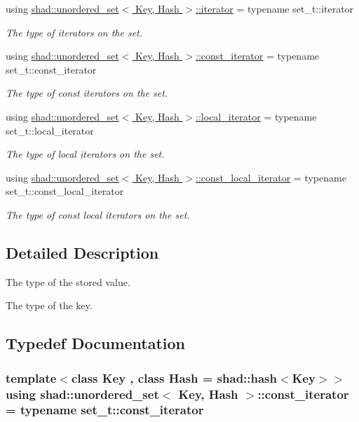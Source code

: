 \begin{DoxyCompactItemize}
using \hyperlink{group__Types_gadbad50ac069a38bd820c0a9f532f903e}{shad\-::unordered\-\_\-set$<$ Key, Hash $>$\-::iterator} = typename set\-\_\-t\-::iterator
\begin{DoxyCompactList}\small\item\em The type of iterators on the set. \end{DoxyCompactList}\item 
using \hyperlink{group__Types_ga074f67d0516c3a68d8c79976aef62fb1}{shad\-::unordered\-\_\-set$<$ Key, Hash $>$\-::const\-\_\-iterator} = typename set\-\_\-t\-::const\-\_\-iterator
\begin{DoxyCompactList}\small\item\em The type of const iterators on the set. \end{DoxyCompactList}\item 
using \hyperlink{group__Types_gae1ee2e5ce1b39afa3cb1ce248747324d}{shad\-::unordered\-\_\-set$<$ Key, Hash $>$\-::local\-\_\-iterator} = typename set\-\_\-t\-::local\-\_\-iterator
\begin{DoxyCompactList}\small\item\em The type of local iterators on the set. \end{DoxyCompactList}\item 
using \hyperlink{group__Types_gac14878d16fabddc52f8dd35465f3155e}{shad\-::unordered\-\_\-set$<$ Key, Hash $>$\-::const\-\_\-local\-\_\-iterator} = typename set\-\_\-t\-::const\-\_\-local\-\_\-iterator
\begin{DoxyCompactList}\small\item\em The type of const local iterators on the set. \end{DoxyCompactList}\end{DoxyCompactItemize}


\subsection{Detailed Description}
The type of the stored value.

The type of the key. 

\subsection{Typedef Documentation}
\hypertarget{group__Types_ga074f67d0516c3a68d8c79976aef62fb1}{
\subsubsection[{const\-\_\-iterator}]{\setlength{\rightskip}{0pt plus 5cm}template$<$class Key , class Hash  = shad\-::hash$<$\-Key$>$$>$ using {\bf shad\-::unordered\-\_\-set}$<$ Key, Hash $>$\-::const\-\_\-iterator =  typename set\-\_\-t\-::const\-\_\-iterator}}\label{group__Types_ga074f67d0516c3a68d8c79976aef62fb1}


